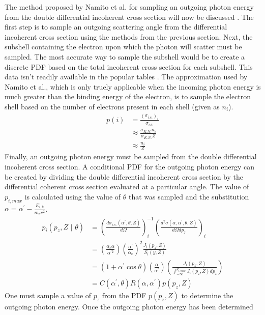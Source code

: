 The method proposed by Namito et al. for sampling an outgoing photon energy
from the double differential incoherent cross section will now be discussed
\citep{namito_implementation_1994}. The first step is to sample an outgoing
scattering angle from the differential incoherent cross section using the 
methods from the previous section. Next, the subshell containing the electron 
upon which the photon will scatter must be sampled. The most accurate
way to sample the subshell would be to create a discrete PDF based on the total
incoherent cross section for each subshell. This data isn't readily available in
the popular tables \citep{cullen_epdl97_1997}. The approximation used by Namito 
et al., which is only truely applicable when the incoming photon energy is much 
greater than the binding energy of the electron, is to sample the electron shell
based on the number of electrons present in each shell (given as $n_i$).
\begin{align}
  p(i) & = \frac{(\sigma_{i.c.})_i}{\sigma_{i.c.}} \nonumber \\
  & \approx \frac{\sigma_{K.N.}n_i}{\sigma_{K.N.}Z} \nonumber \\
  & \approx \frac{n_i}{Z} 
\end{align}
Finally, an outgoing photon energy must be sampled from the double differential 
incoherent cross section. A conditional PDF for the outgoing photon energy can 
be created by dividing the double differential incoherent cross section by the 
differential coherent cross section evaluated at a particular angle. The value
of $p_{i,max}$ is calculated using the value of $\theta$ that was sampled and
the substitution $\alpha = \alpha^{'}-\frac{E_{i,b}}{m_ec^2}$.
\begin{align}
  p_i(p_z,Z \text{ | } \theta) & = 
  \left(\frac{d\sigma_{i.s.}(\alpha^{'},\theta,Z)}{d\Omega} \right)_i^{-1}
  \left(\frac{d^2\sigma(\alpha,\alpha^{'},\theta,Z)}{d\Omega dp_z}\right)_i 
  \nonumber \\
  & = \left(\frac{\alpha_c\alpha}{\alpha^{'2}}\right)
  \left(\frac{\alpha^{'}}{\alpha_c}\right)^2
  \frac{J_i(p_z,Z)}{S_i(y,Z)} \nonumber \\
  & = (1 + \alpha^{'}\cos{\theta})\left(\frac{\alpha}{\alpha^{'}}\right)
  \left(\frac{J_i(p_z,Z)}{\int_{-\infty}^{p_{i,max}}J_i(p_z,Z)dp_z}\right) \nonumber\\
  & = C(\alpha^{'},\theta)R(\alpha,\alpha^{'})p(p_z,Z)
\end{align}
One must sample a value of $p_z$ from the PDF $p(p_z,Z)$ to determine the
outgoing photon energy. Once the outgoing photon energy has been determined
